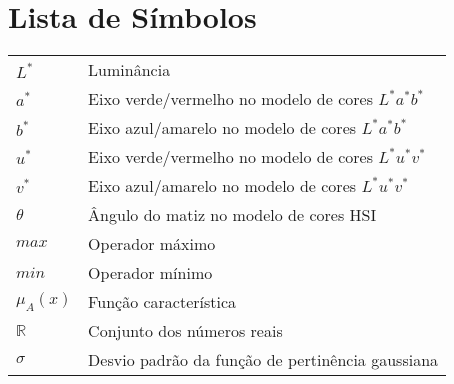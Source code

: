 \documentclass[11pt,twoside,a4paper]{book}
\renewcommand{\chaptermark}[1]{\markboth{\MakeUppercase{#1}}{}}
\theoremstyle{plain}
\theoremstyle{definition}
\begin{document}
\chapter{Lista de Símbolos}
\begin{tabular}{ll}
    $L^*$       & Luminância \\
    $a^*$       & Eixo verde/vermelho no modelo de cores $L^*a^*b^*$ \\
    $b^*$       & Eixo azul/amarelo no modelo de cores $L^*a^*b^*$ \\
    $u^*$       & Eixo verde/vermelho no modelo de cores $L^*u^*v^*$ \\
    $v^*$       & Eixo azul/amarelo no modelo de cores $L^*u^*v^*$ \\
    $\theta$    & Ângulo do matiz no modelo de cores HSI\\
    $max$       & Operador máximo\\
    $min$       & Operador mínimo\\
    $\mu_A(x)$  & Função característica\\
    $\mathbb{R}$& Conjunto dos números reais\\
    $\sigma$    & Desvio padrão da função de pertinência gaussiana
\end{tabular}

\listoffigures            
\listoftables            

\mainmatter

\fancyhead[RE,LO]{\thesection}

\singlespacing              %


\renewcommand{\chaptermark}[1]{\markboth{\MakeUppercase{\appendixname\ \thechapter}} {\MakeUppercase{#1}} }
\fancyhead[RE,LO]{}
\appendix


\backmatter \singlespacing   %


\printindex   %
\end{document}
